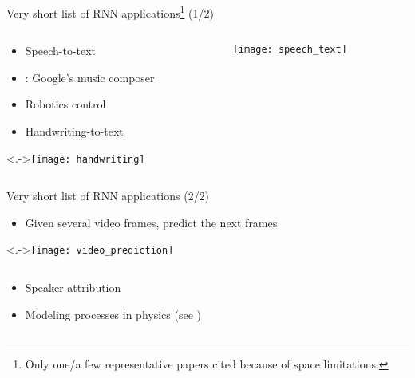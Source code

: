 \setcounter{footnote}{0}

\begin{frame}{%
    Very short list of RNN applications\footnote{%
        Only one/a few representative papers cited because of space limitations.%
    } (1/2)%
}
    \begin{columns}
        \begin{column}{0.63\textwidth}
            \begin{itemize}[<+->]
                \item Speech-to-text \citep{Battenberg17}
                \item {}: Google's music composer \citep{performanceRNN}
                \item Robotics control \citep{WuJIRS07}
                \item Handwriting-to-text \citep{GravesICASSP13}
            \end{itemize}
            \vspace{5mm}

            \visible<.->{\texttt{[image: handwriting]}}
        \end{column}
        \begin{column}{0.37\textwidth}
            \texttt{[image: speech\_text]}
        \end{column}
    \end{columns}
    \vspace{2mm}
\end{frame}

\begin{frame}{Very short list of RNN applications (2/2)}
    \begin{itemize}[<+->]
        \item Given several video frames, predict the next frames
        \citep{SrivastavaICML15, Vukotic17}
    \end{itemize}
    \visible<.->{\texttt{[image: video\_prediction]}}

    \begin{columns}
        \begin{column}{0.43\textwidth}
            \begin{itemize}[<+->]
                \item Speaker attribution \citep{RenAAAICAI16}
                \item Modeling processes in physics (see )
            \end{itemize}
        \end{column}
        \begin{column}{0.5\textwidth}
            \vspace{2mm}
        \end{column}
    \end{columns}
\end{frame}

